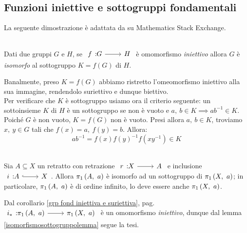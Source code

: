 \subsection{Funzioni iniettive e sottogruppi fondamentali}
La seguente dimostrazione è adattata da \cite{HagenVonEitzen:injectivesubgroup} su Mathematics Stack Exchange.
\begin{lemming}~{}\label{isomorfismosottogruppolemma}\\
Dati due gruppi $G$ e $H$, se $\funz{f}{G}{H}$ è omomorfismo \textit{iniettivo} allora $G$ è \textit{isomorfo} al sottogruppo $K=f\left(G\right)$ di $H$.
\end{lemming}
\begin{demonstration}
	Banalmente, preso $K=f\left(G\right)$ abbiamo ristretto l'omeomorfismo iniettivo alla sua immagine, rendendolo suriettivo e dunque biettivo.\\
	Per verificare che $K$ è sottogruppo usiamo ora il criterio seguente: un sottoinsieme $K$ di $H$ è un sottogruppo se non è vuoto e $a,\ b\in K\implies ab^{-1}\in K$. Poiché $G$ è non vuoto, $K=f\left(G\right)$ non è vuoto. Presi allora $a,\ b\in K$, troviamo $x,\ y\in G$ tali che $f\left(x\right)=a,\ f\left(y\right)=b$. Allora:
	\begin{equation*}
		ab^{-1}=f\left(x\right)f\left(y\right)^{-1}f\left(xy^{-1}\right)\in K
	\end{equation*}
\vspace{-6mm}
\end{demonstration}
\begin{corollary}~{}\\
	Sia $A\subseteq X$ un retratto con retrazione $\funz{r}{X}{A}$ e inclusione $\incl{i}{A}{X}$. Allora $\gruf{A}{a}$ è isomorfo ad un sottogruppo di $\gruf{X}{a}$; in particolare, $\gruf{A}{a}$ è di ordine infinito, lo deve essere anche $\gruf{X}{a}$.
\end{corollary}
\begin{demonstration}
	Dal corollario \ref{grp fond iniettiva e suriettiva}, pag. \pageref{grp fond iniettiva e suriettiva} $\funz{i_{\ast}}{\gruf{A}{a}}{\gruf{X}{a}}$ è un omomorfismo \textit{iniettivo}, dunque dal lemma \ref{isomorfismosottogruppolemma} segue la tesi.
\end{demonstration}
